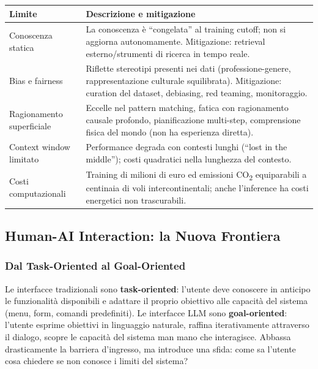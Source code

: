 \documentclass[12pt,a4paper]{article}
\begin{document}
\begin{resultbox}
\begin{center}
\small
\begin{tabular}{lL{9.7cm}}
\toprule
\textbf{Limite} & \textbf{Descrizione e mitigazione} \\
\midrule
Conoscenza statica & La conoscenza \`e ``congelata'' al training cutoff; non si aggiorna autonomamente. Mitigazione: retrieval esterno/strumenti di ricerca in tempo reale. \\
Bias e fairness & Riflette stereotipi presenti nei dati (professione-genere, rappresentazione culturale squilibrata). Mitigazione: curation del dataset, debiasing, red teaming, monitoraggio. \\
Ragionamento superficiale & Eccelle nel pattern matching, fatica con ragionamento causale profondo, pianificazione multi-step, comprensione fisica del mondo (non ha esperienza diretta). \\
Context window limitato & Performance degrada con contesti lunghi (``lost in the middle''); costi quadratici nella lunghezza del contesto. \\
Costi computazionali & Training di milioni di euro ed emissioni CO\textsubscript{2} equiparabili a centinaia di voli intercontinentali; anche l'inference ha costi energetici non trascurabili. \\
\bottomrule
\end{tabular}
\end{center}
\end{resultbox}

\subsection{Human-AI Interaction: la Nuova Frontiera}

\subsubsection{Dal Task-Oriented al Goal-Oriented}

\begin{defbox}
Le interfacce tradizionali sono \textbf{task-oriented}: l'utente deve conoscere in anticipo le funzionalit\`a disponibili e adattare il proprio obiettivo alle capacit\`a del sistema (menu, form, comandi predefiniti). Le interfacce LLM sono \textbf{goal-oriented}: l'utente esprime obiettivi in linguaggio naturale, raffina iterativamente attraverso il dialogo, scopre le capacit\`a del sistema man mano che interagisce. Abbassa drasticamente la barriera d'ingresso, ma introduce una sfida: come sa l'utente cosa chiedere se non conosce i limiti del sistema?
\end{defbox}
\end{document}
